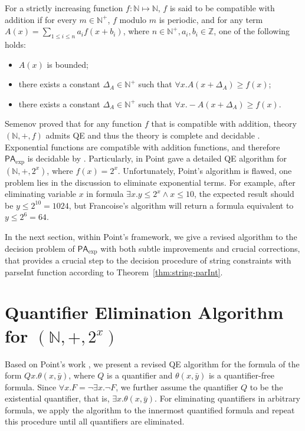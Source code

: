\documentclass[runningheads]{llncs}
\newcommand{\znjSide}[1]{\todo[color=orange!10]{\textbf{ZHAN:} #1}}
\newcommand{\parseInt}{\textsf{parseInt}}
\newcommand{\paexp}{$\textsf{PA}_{\exp}$}
\begin{document}
\begin{definition}
    For a strictly increasing function $f:\mathbb{N}\mapsto \mathbb{N}$, 
    $f$ is said to be compatible with addition 
    if for every $m\in \mathbb{N}^+$,  $f$ modulo $m$ is periodic, 
    and for any term $A(x)=\sum_{1\le i\le n} a_i f(x+b_i)$, 
    where $n \in \mathbb{N}^+, a_i ,b_i \in \mathbb{Z}$,
    one of the following holds:
    \begin{itemize}
        \item $A(x)$ is bounded; 
        \item there exists a constant $\Delta_A\in \mathbb{N}^+$ such that 
        $\forall x. A(x+\Delta_A)\ge f(x)$;
        \item there exists a constant $\Delta_A\in \mathbb{N}^+$ such that 
        $\forall x. -A(x+\Delta_A)\ge f(x)$.
    \end{itemize}
\end{definition}


Semenov proved that for any function $f$ that is compatible with addition, 
theory $(\mathbb{N},+,f)$ admits QE  and thus the theory is complete and decidable \cite{Semenov84}. 
Exponential functions are compatible with addition functions, and therefore {\paexp} is decidable 
by \cite{Semenov84}.
Particularly, in \cite{Point86} Point gave a detailed QE algorithm for $(\mathbb{N},+,2^x)$, where $f(x)=2^x$.
Unfortunately, Point's algorithm is flawed, one problem 
 lies in the discussion to eliminate exponential terms. 
For example, after  eliminating variable $x$ in formula $\exists x. y\le 2^x \wedge x\le 10$,
the expected result should be $y\le 2^{10} =1024$,
but Francoise's algorithm will return a formula equivalent to $y \le 2^6=64$.

In the next section, within Point's framework, we give a revised algorithm
 to the decision problem of {\paexp} with 
both subtle improvements and crucial corrections, that 
provides a crucial step to the decision procedure of string constraints with {\parseInt} function according to 
Theorem~\ref{thm:string-parInt}. 



\section{Quantifier Elimination Algorithm for $(\mathbb{N},+,2^x)$}
Based on Point's work \cite{Point86}, we present a  revised QE algorithm for the formula of the form $Qx.\theta(x,\bar{y})$, 
where $Q$ is a quantifier and $\theta(x,\bar{y})$ is a quantifier-free formula. 
Since $\forall x. F = \neg \exists x. \neg F$, we further assume the quantifier $Q$ to be the existential quantifier, 
that is, $\exists x.\theta(x,\bar{y})$. 
For eliminating quantifiers in arbitrary formula, 
we apply the algorithm to the innermost quantified formula and repeat this procedure until all quantifiers are eliminated.
\end{document}
